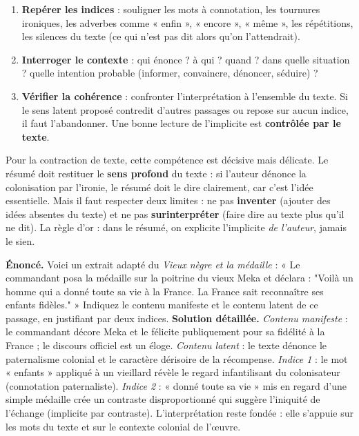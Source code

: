 \documentclass[11pt]{article}
\newcommand{\cle}[1]{{\popxbold\color{popdark}#1}}
\newcounter{popsec}
\newcounter{popsub}
\newcommand{\courssub}[1]{%
  \stepcounter{popsub}%
  \par\vspace{9pt}\noindent{\popxbold\fontsize{11.5}{13}\selectfont\color{popink}{\color{poporange}\thepopsec.\thepopsub}\hspace{6pt}#1}\par\nopagebreak\vspace{4pt}
}
\begin{document}
\courssub{Méthode et importance pour le résumé}

\begin{methode}
\begin{enumerate}
\item \textbf{Repérer les indices} : souligner les mots à connotation, les tournures ironiques, les adverbes comme « enfin », « encore », « même », les répétitions, les silences du texte (ce qui n'est pas dit alors qu'on l'attendrait).
\item \textbf{Interroger le contexte} : qui énonce ? à qui ? quand ? dans quelle situation ? quelle intention probable (informer, convaincre, dénoncer, séduire) ?
\item \textbf{Vérifier la cohérence} : confronter l'interprétation à l'ensemble du texte. Si le sens latent proposé contredit d'autres passages ou repose sur aucun indice, il faut l'abandonner. Une bonne lecture de l'implicite est \textbf{contrôlée par le texte}.
\end{enumerate}
\end{methode}

Pour la \cle{contraction de texte}, cette compétence est décisive mais délicate. Le résumé doit restituer le \textbf{sens profond} du texte : si l'auteur dénonce la colonisation par l'ironie, le résumé doit le dire clairement, car c'est l'idée essentielle. Mais il faut respecter deux limites : ne pas \textbf{inventer} (ajouter des idées absentes du texte) et ne pas \textbf{surinterpréter} (faire dire au texte plus qu'il ne dit). La règle d'or : dans le résumé, on explicite l'implicite \emph{de l'auteur}, jamais le sien.

\begin{exoresolu}
\textbf{Énoncé.} Voici un extrait adapté du \emph{Vieux nègre et la médaille} : « Le commandant posa la médaille sur la poitrine du vieux Meka et déclara : "Voilà un homme qui a donné toute sa vie à la France. La France sait reconnaître ses enfants fidèles." » Indiquez le contenu manifeste et le contenu latent de ce passage, en justifiant par deux indices.
\tcblower
\textbf{Solution détaillée.} \emph{Contenu manifeste} : le commandant décore Meka et le félicite publiquement pour sa fidélité à la France ; le discours officiel est un éloge. \emph{Contenu latent} : le texte dénonce le paternalisme colonial et le caractère dérisoire de la récompense. \emph{Indice 1} : le mot « enfants » appliqué à un vieillard révèle le regard infantilisant du colonisateur (connotation paternaliste). \emph{Indice 2} : « donné toute sa vie » mis en regard d'une simple médaille crée un contraste disproportionné qui suggère l'iniquité de l'échange (implicite par contraste). L'interprétation reste fondée : elle s'appuie sur les mots du texte et sur le contexte colonial de l'œuvre.
\end{exoresolu}
\end{document}
